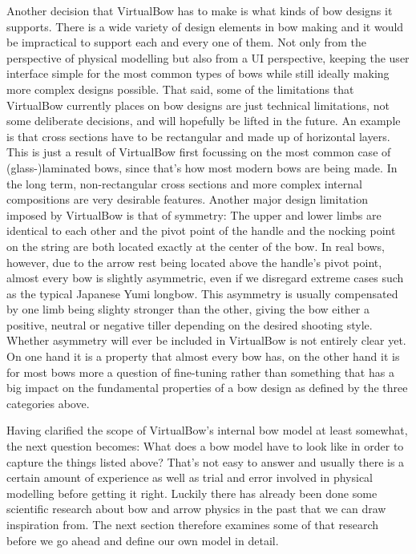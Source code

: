 Another decision that VirtualBow has to make is what kinds of bow designs it supports.
There is a wide variety of design elements in bow making and it would be impractical to support each and every one of them.
Not only from the perspective of physical modelling but also from a UI perspective, keeping the user interface simple for the most common types of bows while still ideally making more complex designs possible.
That said, some of the limitations that VirtualBow currently places on bow designs are just technical limitations, not some deliberate decisions, and will hopefully be lifted in the future.
An example is that cross sections have to be rectangular and made up of horizontal layers.
This is just a result of VirtualBow first focussing on the most common case of \mbox{(glass-)laminated} bows, since that's how most modern bows are being made.
In the long term, non-rectangular cross sections and more complex internal compositions are very desirable features.
Another major design limitation imposed by VirtualBow is that of symmetry: The upper and lower limbs are identical to each other and the pivot point of the handle and the nocking point on the string are both located exactly at the center of the bow.
In real bows, however, due to the arrow rest being located above the handle's pivot point, almost every bow is slightly asymmetric, even if we disregard extreme cases such as the typical Japanese Yumi longbow.
This asymmetry is usually compensated by one limb being slighty stronger than the other, giving the bow either a positive, neutral or negative tiller depending on the desired shooting style.
Whether asymmetry will ever be included in VirtualBow is not entirely clear yet.
On one hand it is a property that almost every bow has, on the other hand it is for most bows more a question of fine-tuning rather than something that has a big impact on the fundamental properties of a bow design as defined by the three categories above.


Having clarified the scope of VirtualBow's internal bow model at least somewhat, the next question becomes: What does a bow model have to look like in order to capture the things listed above?
That's not easy to answer and usually there is a certain amount of experience as well as trial and error involved in physical modelling before getting it right.
Luckily there has already been done some scientific research about bow and arrow physics in the past that we can draw inspiration from.
The next section therefore examines some of that research before we go ahead and define our own model in detail.

